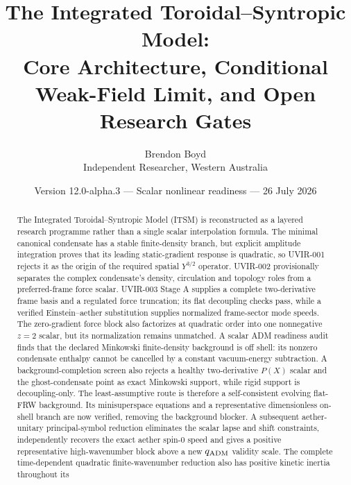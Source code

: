 ﻿\documentclass[11pt]{article}
\title{The Integrated Toroidal--Syntropic Model:\\
Core Architecture, Conditional Weak-Field Limit, and Open Research Gates}
\author{Brendon Boyd\\Independent Researcher, Western Australia}
\date{Version 12.0-alpha.3 --- Scalar nonlinear readiness --- 26 July 2026}
\begin{document}
\maketitle

\begin{center}
\end{center}

\begin{abstract}
The Integrated Toroidal--Syntropic Model (ITSM) is reconstructed as a layered
research programme rather than a single scalar interpolation formula.  The
minimal canonical condensate has a stable finite-density branch, but explicit
amplitude integration proves that its leading static-gradient response is
quadratic, so UVIR-001 rejects it as the origin of the required spatial
$Y^{3/2}$ operator.  UVIR-002 provisionally separates the complex condensate's
density, circulation and topology roles from a preferred-frame force scalar.
UVIR-003 Stage A supplies a complete two-derivative frame basis and a regulated
force truncation; its flat decoupling checks pass, while a verified
Einstein--aether substitution supplies normalized frame-sector mode speeds.
The zero-gradient force block also factorizes at quadratic order into one
nonnegative $z=2$ scalar, but its normalization remains unmatched.  A scalar
ADM readiness audit finds that the declared Minkowski finite-density
background is off shell: its nonzero condensate enthalpy cannot be cancelled
by a constant vacuum-energy subtraction.  A background-completion screen also
rejects a healthy two-derivative $P(X)$ scalar and the ghost-condensate point
as exact Minkowski support, while rigid support is decoupling-only.  The
least-assumptive route is therefore a self-consistent evolving flat-FRW
background.  Its minisuperspace equations and a representative dimensionless
on-shell branch are now verified, removing the background blocker.  A
subsequent aether-unitary principal-symbol reduction eliminates the scalar
lapse and shift constraints, independently recovers the exact aether spin-0
speed and gives a positive representative high-wavenumber block above a new
$q_{\rm ADM}$ validity scale.  The complete time-dependent quadratic
finite-wavenumber reduction also has positive kinetic inertia throughout its

\end{abstract}
\end{document}
